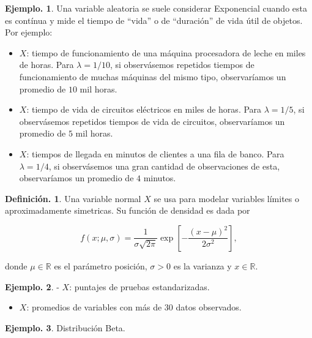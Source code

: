 \documentclass[]{book}
\providecommand{\tightlist}{%
  \setlength{\itemsep}{0pt}\setlength{\parskip}{0pt}}
\theoremstyle{definition}
\newtheorem{definition}{Definición.}[chapter]
\theoremstyle{definition}
\newtheorem{example}{Ejemplo.}[chapter]
\theoremstyle{definition}
\theoremstyle{remark}
\begin{document}
\begin{example}
\protect\hypertarget{exm:unnamed-chunk-119}{}{\label{exm:unnamed-chunk-119} }
Una variable aleatoria se suele considerar Exponencial cuando esta
es contínua y mide el tiempo de ``vida'' o de ``duración'' de vida
útil de objetos. Por ejemplo:

\begin{itemize}
\item
  \(X\): tiempo de funcionamiento de una máquina procesadora
  de leche en miles de horas. Para \(\lambda= 1/10\), si
  observásemos repetidos tiempos de funcionamiento de
  muchas máquinas del mismo tipo, observaríamos un promedio
  de \(10\) mil horas.
\item
  \(X\): tiempo de vida de circuitos eléctricos en miles de horas.
  Para \(\lambda=1/5\), si observásemos repetidos
  tiempos de vida de circuitos, observaríamos un promedio
  de \(5\) mil horas.
\item
  \(X\): tiempos de llegada en minutos de clientes a una fila de
  banco. Para \(\lambda= 1/4\), si observásemos una gran
  cantidad de observaciones de esta, observaríamos un
  promedio de \(4\) minutos.
\end{itemize}
\end{example}

\begin{definition}
\protect\hypertarget{def:unnamed-chunk-120}{}{\label{def:unnamed-chunk-120} }
Una variable normal \(X\) se usa para modelar variables límites o
aproximadamente simetricas. Su función de densidad es dada por

\[ f(x;\mu, \sigma) =
\frac{1}{\sigma\sqrt{2\pi}}\exp\left[-\frac{(x -
\mu)^2}{2\sigma^2}  \right],  \]

donde \(\mu \in \mathbb{R}\) es el parámetro posición,
\(\sigma>0\) es la varianza y \(x\in \mathbb{R}\).
\end{definition}

\begin{example}
\protect\hypertarget{exm:unnamed-chunk-121}{}{\label{exm:unnamed-chunk-121} }
- \(X\): puntajes de pruebas estandarizadas.

\begin{itemize}
\tightlist
\item
  \(X\): promedios de variables con más de \(30\) datos observados.
\end{itemize}
\end{example}

\begin{example}
\protect\hypertarget{exm:unnamed-chunk-122}{}{\label{exm:unnamed-chunk-122} }Distribución Beta.
\end{example}
\end{document}
